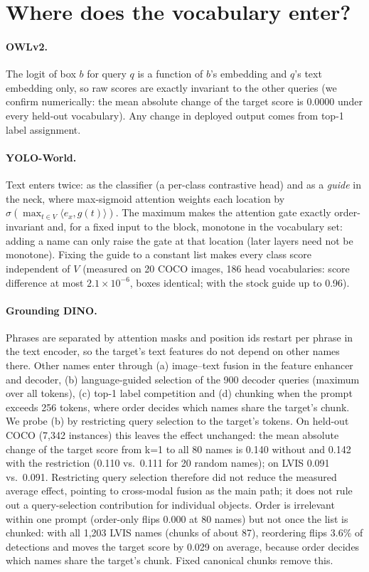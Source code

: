\documentclass[10pt,twocolumn,letterpaper]{article}
\begin{document}
\section{Where does the vocabulary enter?}\label{sec:mech}
\paragraph{OWLv2.} The logit of box $b$ for query $q$ is a function of $b$'s embedding and $q$'s text embedding only,
so raw scores are exactly invariant to the other queries (we confirm numerically: the mean absolute change of the target score is 0.0000 under every held-out vocabulary). Any change
in deployed output comes from top-1 label assignment.
\paragraph{YOLO-World.} Text enters twice: as the classifier (a per-class contrastive head) and as a \emph{guide} in the
neck, where max-sigmoid attention weights each location by $\sigma(\max_{t\in V}\langle e_x, g(t)\rangle)$. The maximum
makes the attention gate exactly order-invariant and, for a fixed input to the block, monotone in the vocabulary
set: adding a name can only raise the gate at that location (later layers need not be monotone). Fixing the guide to a constant list makes every class score independent of $V$
(measured on 20 COCO images, 186 head vocabularies: score difference at most $2.1{\times}10^{-6}$, boxes identical; with the stock guide up to 0.96).
\paragraph{Grounding DINO.} Phrases are separated by attention masks and position ids restart per phrase in the text
encoder, so the target's text features do not depend on other names there. Other names enter through (a) image--text
fusion in the feature enhancer and decoder, (b) language-guided selection of the 900 decoder queries (maximum over all
tokens), (c) top-1 label competition and (d) chunking when the prompt exceeds 256 tokens, where order decides which
names share the target's chunk. We probe (b) by restricting query selection to the target's tokens. On held-out COCO
(7{,}342 instances) this leaves the effect unchanged: the mean absolute change of the target score from k=1 to all 80
names is 0.140 without and 0.142 with the restriction (0.110 vs.\ 0.111 for 20 random names); on LVIS 0.091 vs.\ 0.091.
Restricting query selection therefore did not reduce the measured average effect, pointing to cross-modal fusion as
the main path; it does not rule out a query-selection contribution for individual objects. Order is irrelevant within one prompt (order-only flips 0.000 at 80 names) but not
once the list is chunked: with all 1{,}203 LVIS names (chunks of about 87), reordering flips 3.6\% of detections and
moves the target score by 0.029 on average, because order decides which names share the target's chunk. Fixed
canonical chunks remove this.
\end{document}

